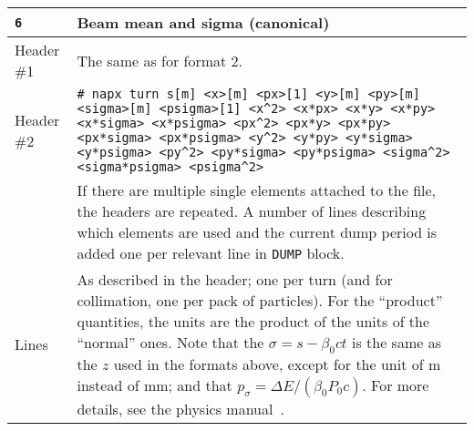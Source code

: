\begin{center}
\begin{longtable}{|p{1.8cm}|p{13.8cm}|}
        \rowcolor{blue!15}
        \texttt{6} & Beam mean and sigma (canonical) \\
        \hline
        Header \#1 & The same as for format 2.\\
        \hline
        Header \#2 & \texttt{\# napx turn s[m] <x>[m] <px>[1] <y>[m] <py>[m] <sigma>[m] <psigma>[1] <x\^{}2> <x*px> <x*y> <x*py> <x*sigma> <x*psigma> <px\^{}2> <px*y> <px*py> <px*sigma> <px*psigma> <y\^{}2> <y*py> <y*sigma> <y*psigma> <py\^{}2> <py*sigma> <py*psigma> <sigma\^{}2> <sigma*psigma> <psigma\^{}2>}\vspace{1mm}\\
                   & If there are multiple single elements attached to the file, the headers are repeated. A number of lines describing which elements are used and the current dump period is added one per relevant line in \texttt{DUMP} block.\\
        \hline
        Lines      & As described in the header; one per turn (and for collimation, one per pack of particles). For the ``product'' quantities, the units are the product of the units of the ``normal'' ones. Note that the $\sigma=s -\beta_0 c t$ is the same as the $z$ used in the formats above, except for the unit of m instead of mm; and that $p_\sigma = \Delta E / \left(\beta_0 P_0 c\right)$. For more details, see the physics manual~\cite{sixphys}. \\
        \hline
        

\end{longtable}
\end{center}
